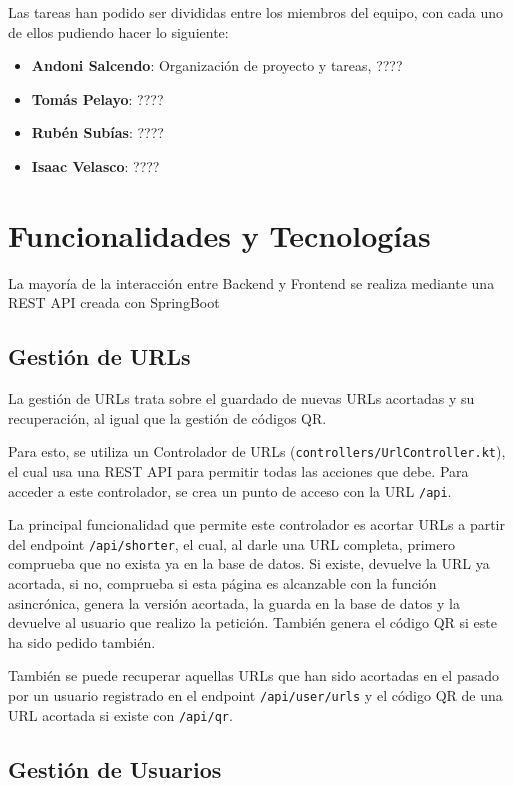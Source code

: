 \documentclass{article}
\begin{document}
Las tareas han podido ser divididas entre los miembros del equipo, con cada uno de ellos pudiendo hacer lo siguiente:

\begin{itemize}
	 \item \textbf{Andoni Salcendo}: Organización de proyecto y tareas, ????
	 \item \textbf{Tomás Pelayo}: ????
	 \item \textbf{Rubén Subías}: ????
	 \item \textbf{Isaac Velasco}: ????
\end{itemize}

\section {Funcionalidades y Tecnologías}

La mayoría de la interacción entre Backend y Frontend se realiza mediante una REST API creada con SpringBoot\cite{springboot}

\subsection{Gestión de URLs}

La gestión de URLs trata sobre el guardado de nuevas URLs acortadas y su recuperación, al igual que la gestión de códigos QR.

Para esto, se utiliza un Controlador de URLs (\texttt{controllers/UrlController.kt}), el cual usa una REST API para permitir todas las acciones que debe. Para acceder
a este controlador, se crea un punto de acceso con la URL \texttt{/api}.

La principal funcionalidad que permite este controlador es acortar URLs a partir del endpoint \texttt{/api/shorter}, el cual, al darle una URL completa, primero comprueba
que no exista ya en la base de datos. Si existe, devuelve la URL ya acortada, si no, comprueba si esta página es alcanzable con la función asincrónica, genera la versión acortada, la
guarda en la base de datos y la devuelve al usuario que realizo la petición. También genera el código QR si este ha sido pedido también.

También se puede recuperar aquellas URLs que han sido acortadas en el pasado por un usuario registrado en el endpoint \texttt{/api/user/urls} y el código QR de una URL acortada
si existe con \texttt{/api/qr}.

\subsection{Gestión de Usuarios}
\end{document}
